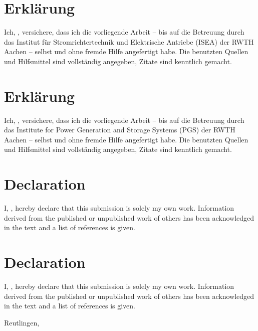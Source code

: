 

\label{InternalDeclaration}
{%
	{
		\chapter*{Erklärung}
		
		Ich, \varAuthorGiven{} \varAuthorFamily{}, versichere, dass ich die vorliegende Arbeit -- bis auf die Betreuung durch das Institut für Stromrichter\-technik und Elektrische Antriebe (ISEA) der RWTH Aachen -- selbst und ohne fremde Hilfe angefertigt habe. Die benutzten Quellen und Hilfsmittel sind vollständig angegeben, Zitate sind kenntlich gemacht.
	}
	{
		\chapter*{Erklärung}
		
		Ich, \varAuthorGiven{} \varAuthorFamily{}, versichere, dass ich die vorliegende Arbeit -- bis auf die Betreuung durch das Institute for Power Generation and Storage Systems (PGS) der RWTH Aachen -- selbst und ohne fremde Hilfe angefertigt habe. Die benutzten Quellen und Hilfsmittel sind vollständig angegeben, Zitate sind kenntlich gemacht.
	}
}%
{%
	{
		\chapter*{Declaration}
		
		I, \varAuthorGiven{} \varAuthorFamily{}, hereby declare that this submission is solely my own work. Information derived from the published or unpublished work of others has been acknowledged in the text and a list of references is given.
	}
	{
		\chapter*{Declaration}
		
		I, \varAuthorGiven{} \varAuthorFamily{}, hereby declare that this submission is solely my own work. Information derived from the published or unpublished work of others has been acknowledged in the text and a list of references is given.
	}
}%

\vspace{1cm}
Reutlingen, \varDate

\cleardoubleemptypage

